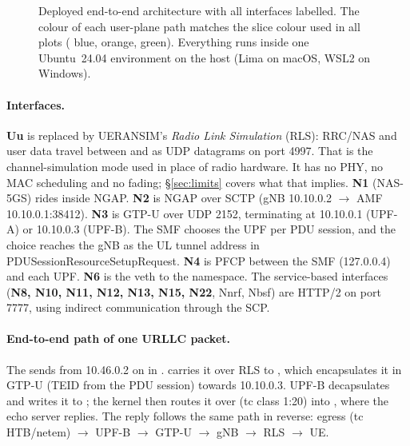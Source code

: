 \begin{figure}[H]
{}
\caption{Deployed end-to-end architecture with all interfaces labelled. The colour of each
user-plane path matches the slice colour used in all plots ( blue, 
orange,  green). Everything runs inside one Ubuntu~24.04 environment on the host
(Lima on macOS, WSL2 on Windows).}
\label{fig:arch}
\end{figure}

\paragraph{Interfaces.} \textbf{Uu} is replaced by UERANSIM's \emph{Radio Link Simulation}
(RLS): RRC/NAS and user data travel between  and  as UDP datagrams on
port 4997. That is the channel-simulation mode used in place of radio hardware. It has no PHY,
no MAC scheduling and no fading; \S\ref{sec:limits} covers what that implies.
\textbf{N1} (NAS-5GS) rides inside NGAP. \textbf{N2} is NGAP over SCTP (gNB 10.10.0.2
$\rightarrow$ AMF 10.10.0.1:38412). \textbf{N3} is GTP-U over UDP 2152, terminating at
10.10.0.1 (UPF-A) or 10.10.0.3 (UPF-B). The SMF chooses the UPF per PDU session, and the
choice reaches the gNB as the UL tunnel address in PDUSessionResourceSetupRequest.
\textbf{N4} is PFCP between the SMF (127.0.0.4) and each UPF. \textbf{N6} is the veth to the
 namespace. The service-based interfaces (\textbf{N8, N10, N11, N12, N13, N15, N22},
Nnrf, Nbsf) are HTTP/2 on port 7777, using indirect communication through the SCP.

\paragraph{End-to-end path of one URLLC packet.} The  sends from 10.46.0.2
on  in .  carries it over RLS to , which
encapsulates it in GTP-U (TEID from the PDU session) towards 10.10.0.3. UPF-B decapsulates and
writes it to ; the kernel then routes it over  (tc class 1:20)
into , where the echo server replies. The reply follows the same path in reverse:
 egress (tc HTB/netem) $\rightarrow$ UPF-B $\rightarrow$ GTP-U $\rightarrow$
gNB $\rightarrow$ RLS $\rightarrow$ UE.

